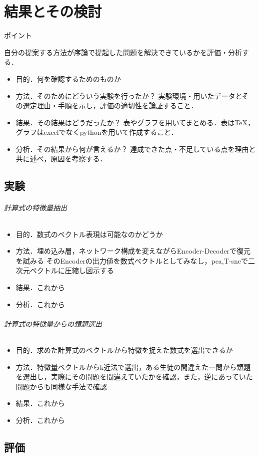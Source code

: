 \documentclass[a4j,11pt,report]{jsbook}
\newcommand{\point}[1]{
\begin{itembox}[l]{ポイント}
  #1
\end{itembox}
}
\begin{document}
\chapter{結果とその検討 \label{ch:result}}

\point{
自分の提案する方法が序論で提起した問題を解決できているかを評価・分析する．
\begin{itemize}
  \item 目的．何を確認するためのものか
  \item 方法．そのためにどういう実験を行ったか？ 実験環境・用いたデータとその選定理由・手順を示し，評価の適切性を論証すること．
  \item 結果．その結果はどうだったか？ 表やグラフを用いてまとめる．表はTeX，グラフはexcelでなくpythonを用いて作成すること．
  \item 分析．その結果から何が言えるか？ 達成できた点・不足している点を理由と共に述べ，原因を考察する．
\end{itemize}
}

\section{実験}
\subparagraph{計算式の特徴量抽出}
\begin{itemize}
  \item 目的．数式のベクトル表現は可能なのかどうか
  \item 方法．埋め込み層，ネットワーク構成を変えながらEncoder-Decoderで復元を試みる
  そのEncoderの出力値を数式ベクトルとしてみなし，pca,T-sneで二次元ベクトルに圧縮し図示する
  \item 結果．これから
  \item 分析．これから
\end{itemize}

\subparagraph{計算式の特徴量からの類題選出}
\begin{itemize}
  \item 目的．求めた計算式のベクトルから特徴を捉えた数式を選出できるか
  \item 方法．特徴量ベクトルからk近法で選出，ある生徒の間違えた一問から類題を選出し，実際にその問題を間違えていたかを確認，また，逆にあっていた問題からも同様な手法で確認
  \item 結果．これから
  \item 分析．これから
\end{itemize}
\section{評価}
\end{document}
